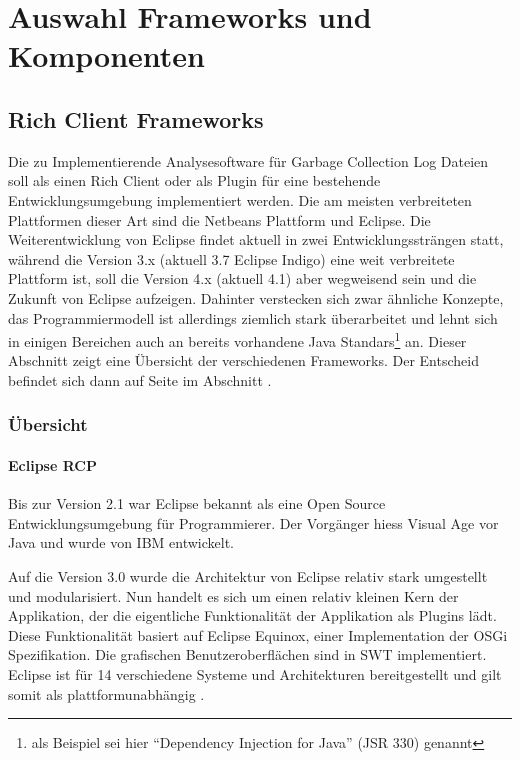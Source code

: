 \chapter{Auswahl Frameworks und Komponenten}\label{selection_rcp_fw}
\section{Rich Client Frameworks}
Die zu Implementierende Analysesoftware für Garbage Collection Log Dateien soll als einen Rich Client oder als Plugin für eine bestehende Entwicklungsumgebung implementiert werden. Die am meisten verbreiteten Plattformen dieser Art sind die Netbeans Plattform und Eclipse. Die Weiterentwicklung von Eclipse findet aktuell in zwei Entwicklungssträngen statt, während die Version 3.x (aktuell 3.7 Eclipse Indigo) eine weit verbreitete Plattform ist, soll die Version 4.x (aktuell 4.1) aber wegweisend sein und die Zukunft von Eclipse aufzeigen. Dahinter verstecken sich zwar ähnliche Konzepte, das Programmiermodell ist allerdings ziemlich stark überarbeitet und lehnt sich in einigen Bereichen auch an bereits vorhandene Java Standars\footnote{als Beispiel sei hier ``Dependency Injection for Java'' (JSR 330) genannt} an. Dieser Abschnitt zeigt eine Übersicht der verschiedenen Frameworks. Der Entscheid befindet sich dann auf Seite \pageref{rcp_entscheid} im Abschnitt  .

\subsection{Übersicht}
\subsubsection{Eclipse RCP}
Bis zur Version 2.1 war Eclipse bekannt als eine Open Source Entwicklungsumgebung für Programmierer. Der Vorgänger hiess Visual Age vor Java und wurde von IBM entwickelt. 

Auf die Version 3.0 wurde die Architektur von Eclipse relativ stark umgestellt und modularisiert. Nun handelt es sich um einen relativ kleinen Kern der Applikation, der die eigentliche Funktionalität der Applikation als Plugins lädt. Diese Funktionalität basiert auf Eclipse Equinox, einer Implementation der OSGi Spezifikation. Die grafischen Benutzeroberflächen sind in SWT implementiert. Eclipse ist für 14 verschiedene Systeme und Architekturen bereitgestellt und gilt somit als plattformunabhängig \cite{wiki:eclipse}. 

